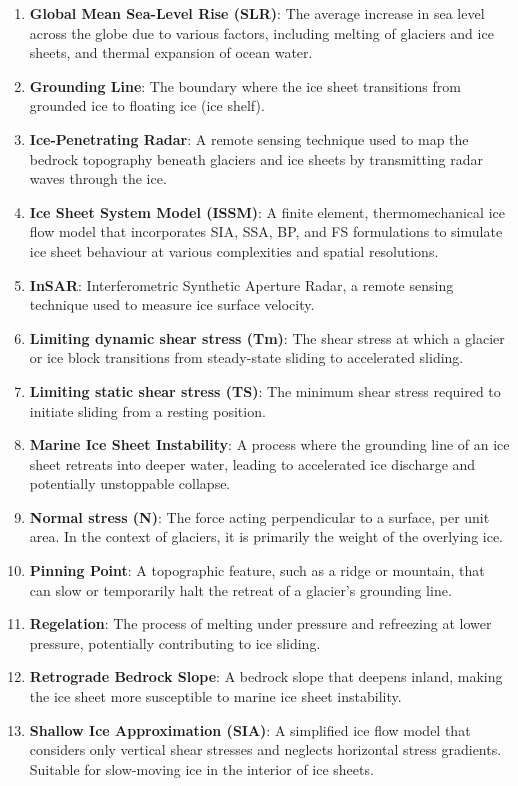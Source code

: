 \begin{enumerate}
\item \textbf{Global Mean Sea-Level Rise (SLR)}: The average increase in sea level across the globe due to various factors, including melting of glaciers and ice sheets, and thermal expansion of ocean water.
\item \textbf{Grounding Line}: The boundary where the ice sheet transitions from grounded ice to floating ice (ice shelf).
\item \textbf{Ice-Penetrating Radar}: A remote sensing technique used to map the bedrock topography beneath glaciers and ice sheets by transmitting radar waves through the ice.
\item \textbf{Ice Sheet System Model (ISSM)}: A finite element, thermomechanical ice flow model that incorporates SIA, SSA, BP, and FS formulations to simulate ice sheet behaviour at various complexities and spatial resolutions.
\item \textbf{InSAR}: Interferometric Synthetic Aperture Radar, a remote sensing technique used to measure ice surface velocity.
\item \textbf{Limiting dynamic shear stress (Tm)}: The shear stress at which a glacier or ice block transitions from steady-state sliding to accelerated sliding.
\item \textbf{Limiting static shear stress (TS)}: The minimum shear stress required to initiate sliding from a resting position.
\item \textbf{Marine Ice Sheet Instability}: A process where the grounding line of an ice sheet retreats into deeper water, leading to accelerated ice discharge and potentially unstoppable collapse.
\item \textbf{Normal stress (N)}: The force acting perpendicular to a surface, per unit area. In the context of glaciers, it is primarily the weight of the overlying ice.
\item \textbf{Pinning Point}: A topographic feature, such as a ridge or mountain, that can slow or temporarily halt the retreat of a glacier's grounding line.
\item \textbf{Regelation}: The process of melting under pressure and refreezing at lower pressure, potentially contributing to ice sliding.
\item \textbf{Retrograde Bedrock Slope}: A bedrock slope that deepens inland, making the ice sheet more susceptible to marine ice sheet instability.
\item \textbf{Shallow Ice Approximation (SIA)}: A simplified ice flow model that considers only vertical shear stresses and neglects horizontal stress gradients. Suitable for slow-moving ice in the interior of ice sheets.

\end{enumerate}
